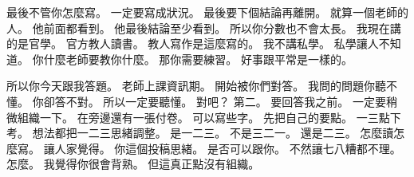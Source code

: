 \hypertarget{c01:cue:3713}{}最後不管你怎麼寫。
\hypertarget{c01:cue:3714}{}一定要寫成狀況。
\hypertarget{c01:cue:3715}{}最後要下個結論再離開。
\hypertarget{c01:cue:3716}{}就算一個老師的人。
\hypertarget{c01:cue:3717}{}他前面都看到。
\hypertarget{c01:cue:3718}{}他最後結論至少看到。
\hypertarget{c01:cue:3719}{}所以你分數也不會太長。
\hypertarget{c01:cue:3720}{}我現在講的是官學。
\hypertarget{c01:cue:3721}{}官方教人讀書。
\hypertarget{c01:cue:3722}{}教人寫作是這麼寫的。
\hypertarget{c01:cue:3723}{}我不講私學。
\hypertarget{c01:cue:3724}{}私學讓人不知道。
\hypertarget{c01:cue:3725}{}你什麼老師要教你什麼。
\hypertarget{c01:cue:3726}{}那你需要練習。
\hypertarget{c01:cue:3727}{}好事跟平常是一樣的。

\hypertarget{c01:cue:3728}{}所以你今天跟我答題。
\hypertarget{c01:cue:3729}{}老師上課資訊期。
\hypertarget{c01:cue:3730}{}開始被你們對答。
\hypertarget{c01:cue:3731}{}我問的問題你聽不懂。
\hypertarget{c01:cue:3732}{}你卻答不對。
\hypertarget{c01:cue:3733}{}所以一定要聽懂。
\hypertarget{c01:cue:3734}{}對吧？
\hypertarget{c01:cue:3735}{}第二。
\hypertarget{c01:cue:3736}{}要回答我之前。
\hypertarget{c01:cue:3737}{}一定要稍微組織一下。
\hypertarget{c01:cue:3738}{}在旁邊還有一張付卷。
\hypertarget{c01:cue:3739}{}可以寫些字。
\hypertarget{c01:cue:3740}{}先把自己的要點。
\hypertarget{c01:cue:3741}{}一三點下考。
\hypertarget{c01:cue:3742}{}想法都把一二三思緒調整。
\hypertarget{c01:cue:3743}{}是一二三。
\hypertarget{c01:cue:3744}{}不是三二一。
\hypertarget{c01:cue:3745}{}還是二三。
\hypertarget{c01:cue:3746}{}怎麼讀怎麼寫。
\hypertarget{c01:cue:3747}{}讓人家覺得。
\hypertarget{c01:cue:3748}{}你這個投稿思緒。
\hypertarget{c01:cue:3749}{}是否可以跟你。
\hypertarget{c01:cue:3750}{}不然讓七八糟都不理。
\hypertarget{c01:cue:3751}{}怎麼。
\hypertarget{c01:cue:3752}{}我覺得你很會背熟。
\hypertarget{c01:cue:3753}{}但這真正點沒有組織。


